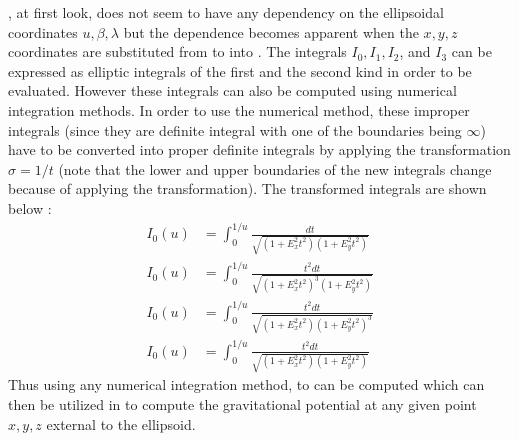 , at first look, does not seem to have any dependency on the ellipsoidal coordinates $u,\beta,\lambda$ but the dependence becomes apparent when the $x,y,z$ coordinates are substituted from  to  into . The integrals $I_0, I_1, I_2$, and $I_3$ can be expressed as elliptic integrals of the first and the second kind in order to be evaluated. However these integrals can also be computed using numerical integration methods. In order to use the numerical method, these improper integrals (since they are definite integral with one of the boundaries being $\infty$) have to be converted into proper definite integrals by applying the transformation $\sigma = 1/t$ (note that the lower and upper boundaries of the new integrals change because of applying the transformation). The transformed integrals are shown below \cite{elliptic_integral}:
\begin{align}
\label{I0t}
I_0(u) &= \int_0^{1/u} \frac{dt}{\sqrt{(1+E_x^2 t^2)(1 + E_y^2 t^2)}} \\
\label{I1t}
I_0(u) &= \int_0^{1/u} \frac{t^2 dt}{\sqrt{(1+E_x^2 t^2)^3(1 + E_y^2 t^2)}} \\
\label{I2t}
I_0(u) &= \int_0^{1/u} \frac{t^2 dt}{\sqrt{(1+E_x^2 t^2)(1 + E_y^2 t^2)^3}} \\
\label{I3t}
I_0(u) &= \int_0^{1/u} \frac{t^2 dt}{\sqrt{(1+E_x^2 t^2)(1 + E_y^2 t^2)}}
\end{align}
%
Thus using any numerical integration method,  to  can be computed which can then be utilized in  to compute the gravitational potential at any given point $x,y,z$ external to the ellipsoid.

